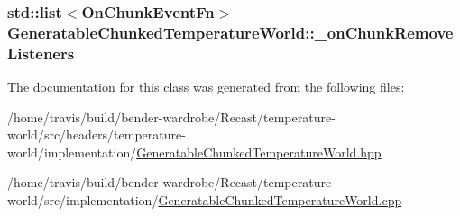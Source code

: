 \hypertarget{class_generatable_chunked_temperature_world_a4f5ce92a800ce903982033724d025e09}{
\subsubsection[{\-\_\-on\-Chunk\-Remove\-Listeners}]{\setlength{\rightskip}{0pt plus 5cm}std\-::list$<${\bf On\-Chunk\-Event\-Fn}$>$ Generatable\-Chunked\-Temperature\-World\-::\-\_\-on\-Chunk\-Remove\-Listeners\hspace{0.3cm}{\ttfamily [protected]}}}\label{class_generatable_chunked_temperature_world_a4f5ce92a800ce903982033724d025e09}


The documentation for this class was generated from the following files\-:\begin{DoxyCompactItemize}
\item 
/home/travis/build/bender-\/wardrobe/\-Recast/temperature-\/world/src/headers/temperature-\/world/implementation/\hyperlink{_generatable_chunked_temperature_world_8hpp}{Generatable\-Chunked\-Temperature\-World.\-hpp}\item 
/home/travis/build/bender-\/wardrobe/\-Recast/temperature-\/world/src/implementation/\hyperlink{_generatable_chunked_temperature_world_8cpp}{Generatable\-Chunked\-Temperature\-World.\-cpp}\end{DoxyCompactItemize}
